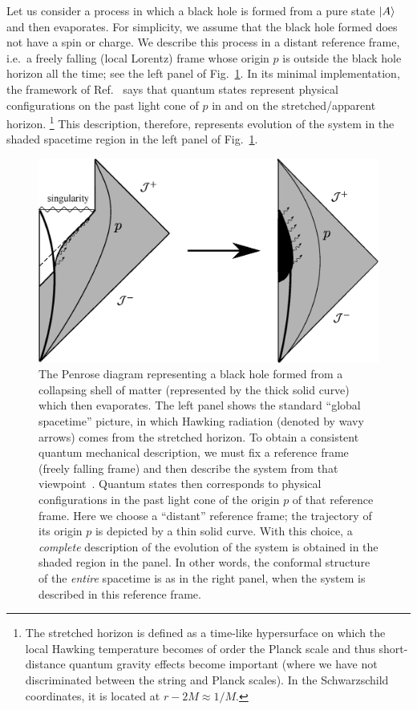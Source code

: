 \documentclass[12pt]{article}
\begin{document}
Let us consider a process in which a black hole is formed from a pure 
state $\left| A \right>$ and then evaporates.  For simplicity, we assume that the 
black hole formed does not have a spin or charge.  We describe this process 
in a distant reference frame, i.e.\ a freely falling (local Lorentz) 
frame whose origin $p$ is outside the black hole horizon all the time; 
see the left panel of Fig.~\ref{fig:Penrose-outside}.  In its minimal 
implementation, the framework of Ref.~\cite{Nomura:2011rb} says that 
quantum states represent physical configurations on the past light cone 
of $p$ in and on the stretched/apparent horizon.%
\footnote{The stretched horizon is defined as a time-like hypersurface 
 on which the local Hawking temperature becomes of order the Planck scale 
 and thus short-distance quantum gravity effects become important (where 
 we have not discriminated between the string and Planck scales).  In 
 the Schwarzschild coordinates, it is located at $r - 2M \approx 1/M$.}
This description, therefore, represents evolution of the system in the 
shaded spacetime region in the left panel of Fig.~\ref{fig:Penrose-outside}.
%
\begin{figure}[t]
\begin{center}
  \includegraphics[width=12cm]{figure/Penrose-1.eps}
\caption{The Penrose diagram representing a black hole formed from a 
 collapsing shell of matter (represented by the thick solid curve) which 
 then evaporates.  The left panel shows the standard ``global spacetime'' 
 picture, in which Hawking radiation (denoted by wavy arrows) comes 
 from the stretched horizon.  To obtain a consistent quantum mechanical 
 description, we must fix a reference frame (freely falling frame) and 
 then describe the system from that viewpoint~\cite{Nomura:2011rb}. 
 Quantum states then corresponds to physical configurations in the past 
 light cone of the origin $p$ of that reference frame.  Here we choose 
 a ``distant'' reference frame; the trajectory of its origin $p$ is 
 depicted by a thin solid curve.  With this choice, a {\it complete} 
 description of the evolution of the system is obtained in the shaded 
 region in the panel.  In other words, the conformal structure of the 
 {\it entire} spacetime is as in the right panel, when the system is 
 described in this reference frame.}
\label{fig:Penrose-outside}
\end{center}
\end{figure}
%
\end{document}
